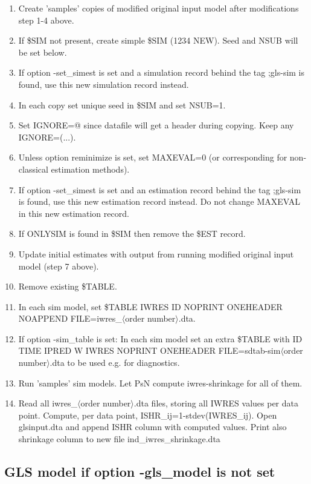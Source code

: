 \begin{enumerate}
\item Create 'samples' copies of modified original input model after modifications step 1-4 above.
\item If \$SIM not present, create simple \$SIM (1234 NEW). Seed and NSUB will be set below.
\item If option -set\_simest is set and a simulation record behind the tag ;gls-sim is found, use this new simulation record instead.  
\item In each copy set unique seed in \$SIM and set NSUB=1.
\item Set IGNORE=@ since datafile will get a header during copying. Keep any IGNORE=(...).
\item Unless option reminimize is set, set MAXEVAL=0 (or corresponding for non-classical estimation methods). 
\item If option -set\_simest is set and an estimation record behind the tag ;gls-sim is found, use this new estimation record instead. Do not change MAXEVAL in this new estimation record.
\item If ONLYSIM is found in \$SIM then remove the \$EST record.
\item Update initial estimates with output from running modified original input model (step 7 above).
\item Remove existing \$TABLE.
\item In each sim model, set \$TABLE IWRES ID NOPRINT ONEHEADER NOAPPEND FILE=iwres\_$\langle$order number$\rangle$.dta.
\item If option -sim\_table is set: In each sim model set an extra \$TABLE
 with ID TIME IPRED W IWRES NOPRINT ONEHEADER FILE=sdtab-sim$\langle$order number$\rangle$.dta to be used e.g. for diagnostics.
\item Run 'samples' sim models. Let PsN compute iwres-shrinkage for all of them.
\item Read all iwres\_$\langle$order number$\rangle$.dta files, storing all IWRES values per data point. Compute, per data point, ISHR\_ij=1-stdev(IWRES\_ij). Open glsinput.dta and append ISHR column with computed values. Print also shrinkage column to new file ind\_iwres\_shrinkage.dta
\end{enumerate}

\subsection{GLS model if option -gls\_model is not set}

